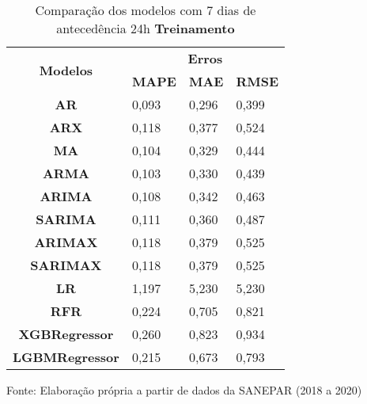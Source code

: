 \begin{table}[H]
	\centering
	\caption{Comparação dos modelos com 7 dias de antecedência 24h \textbf{Treinamento} }\label{tb:10-24trn}
	\begin{tabular}{@{}clll@{}}
		\toprule
		\multirow{2}{*}{\textbf{Modelos}} & \multicolumn{3}{c}{\textbf{Erros}}                                                                       \\ \cmidrule(l){2-4} 
		& \multicolumn{1}{c}{\textbf{MAPE}} & \multicolumn{1}{c}{\textbf{MAE}} & \multicolumn{1}{c}{\textbf{RMSE}} \\ \hline
\textbf{AR}                       & 0,093                             & 0,296                            & 0,399                             \\
\textbf{ARX}                      & 0,118                             & 0,377                            & 0,524                             \\
\textbf{MA}                       & 0,104                             & 0,329                            & 0,444                             \\
\textbf{ARMA}                     & 0,103                             & 0,330                            & 0,439                             \\
\textbf{ARIMA}                    & 0,108                             & 0,342                            & 0,463                             \\
\textbf{SARIMA}                   & 0,111                             & 0,360                            & 0,487                             \\
\textbf{ARIMAX}                   & 0,118                             & 0,379                            & 0,525                             \\
\textbf{SARIMAX}                  & 0,118                             & 0,379                            & 0,525                             \\
\textbf{LR}                       & 1,197                             & 5,230                            & 5,230                             \\
\textbf{RFR}                      & 0,224                             & 0,705                            & 0,821                             \\
\textbf{XGBRegressor}             & 0,260                             & 0,823                            & 0,934                             \\
\textbf{LGBMRegressor}            & 0,215                             & 0,673                            & 0,793                             \\ \bottomrule
	\end{tabular}

Fonte: Elaboração própria a partir de dados da SANEPAR (2018 a 2020)
\end{table}

